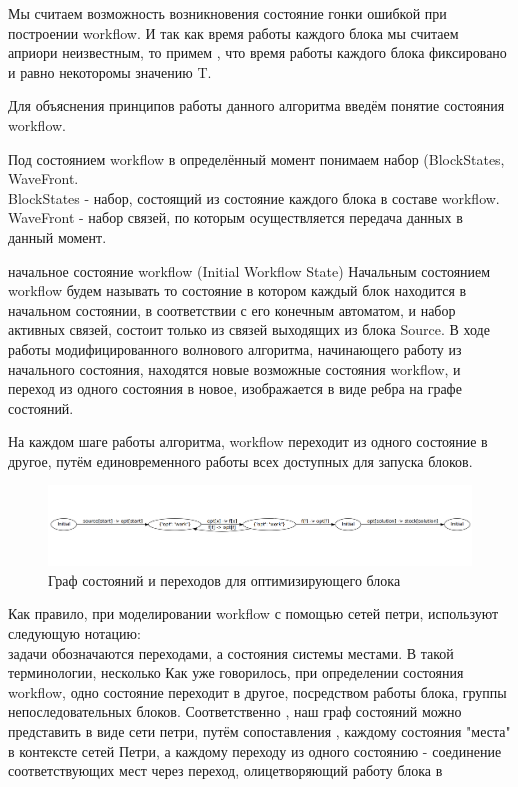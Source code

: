 \documentclass[a4paper,14pt]{article}
\begin{document}
Мы считаем возможность возникновения состояние гонки ошибкой при построении workflow. И так как время работы каждого блока мы считаем априори неизвестным, то примем , что время работы каждого блока фиксировано и равно некоторомы значению T.


Для объяснения принципов работы данного алгоритма введём понятие состояния workflow.

Под состоянием workflow в определённый момент понимаем набор (BlockStates, WaveFront.\\
BlockStates - набор, состоящий из состояние каждого блока в составе workflow.\\

WaveFront - набор связей, по которым осуществляется передача данных в данный момент.


начальное состояние workflow (Initial Workflow State)	Начальным состоянием workflow будем называть то состояние в котором каждый блок находится в начальном состоянии, в соответствии с его конечным автоматом, и набор активных связей, состоит только из связей выходящих из блока Source.
В ходе работы модифицированного волнового алгоритма, начинающего работу из начального состояния, находятся новые возможные состояния workflow, и переход из одного состояния в новое, изображается в виде ребра на графе состояний.

На каждом шаге работы алгоритма, workflow переходит из одного состояние в другое, путём единовременного работы всех доступных для запуска блоков.


\begin{figure}[here]
    \centering
    \includegraphics[width=\textwidth]{optimization_state_graph.png}
    \caption{Граф состояний и переходов для оптимизирующего блока }
    \label{img:opt_wf}
\end{figure}


Как правило, при моделировании workflow с помощью сетей петри, используют следующую нотацию:\\
задачи обозначаются переходами, а состояния системы местами.
В такой терминологии, несколько  
Как уже говорилось, при определении состояния workflow, одно состояние переходит в другое, посредством работы блока, группы непоследовательных блоков. Соответственно , наш граф состояний можно представить в виде сети петри, путём сопоставления , каждому состояния "места" в контексте сетей Петри, а каждому переходу из одного состоянию - соединение соответствующих мест через переход, олицетворяющий работу блока в 
\end{document}
